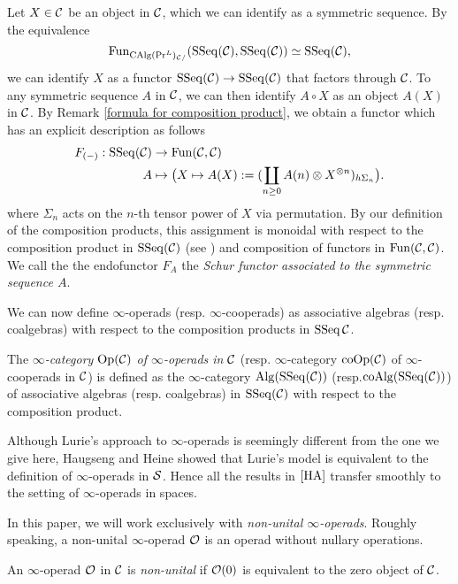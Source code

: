 \begin{remark}
\label{Schur functor}
Let $X \in {\mathcal{C}}$ be an object in ${\mathcal{C}}$, which we can identify as a symmetric sequence.
By the equivalence
$$
\operatorname{Fun}_{\operatorname{CAlg}(\Pr^L)_{{\mathcal{C}}/}}(\operatorname{SSeq}({\mathcal{C}}),\operatorname{SSeq}({\mathcal{C}}))
\simeq
\operatorname{SSeq}({\mathcal{C}}),
$$
we can identify $X$ as a functor $\operatorname{SSeq}({\mathcal{C}}) \to \operatorname{SSeq}({\mathcal{C}})$ that factors through ${\mathcal{C}}$.
To any symmetric sequence $A$ in ${\mathcal{C}}$,  we can then identify $A\circ X$ as an object $A(X)$ in ${\mathcal{C}}$.
By Remark \ref{formula for composition product}, we obtain a functor which has an explicit description as follows
\begin{align*}
		F_{(-)}: \operatorname{SSeq}({\mathcal{C}}) & \rightarrow \operatorname{Fun}({\mathcal{C}},{\mathcal{C}})\\
	A        & \mapsto \big( X\mapsto  A(X):=(\coprod_{n\geq 0} A(n)\otimes X^{\otimes n})_{h\Sigma_n}\big).
\end{align*}
where $\Sigma_n$ acts on the $n$-th tensor power of $X$ via permutation.
By our definition of the composition products, this assignment is monoidal with respect to the composition product in $\operatorname{SSeq}({\mathcal{C}})$ (see \cite[\S 3.1 ]{Francis-Gaitsgory}) and composition of functors in $\operatorname{Fun}({\mathcal{C}},{\mathcal{C}})$.
We call the the endofunctor $F_A$ the \emph{Schur functor associated to the symmetric sequence $A$}.
\end{remark}

We can now define $\infty$-operads (resp. $\infty$-cooperads) as associative algebras (resp. coalgebras) with respect to the composition products in $\operatorname{SSeq}{{\mathcal{C}}}$.
\begin{definition}
	\label{inf operads}
	The \emph{$\infty$-category $\operatorname{Op}({\mathcal{C}})$ of $\infty$-operads in ${\mathcal{C}}$} (resp. $\infty$-category $\operatorname{coOp}({\mathcal{C}})$ of $\infty$-cooperads in ${\mathcal{C}}$) is defined as the $\infty$-category $\operatorname{Alg}(\operatorname{SSeq}({\mathcal{C}}))$ (resp.$\operatorname{coAlg}(\operatorname{SSeq}({\mathcal{C}}))$) of associative algebras (resp. coalgebras) in $\operatorname{SSeq}({\mathcal{C}})$ with respect to the composition product.
\end{definition}


\begin{remark}
Although Lurie's approach to $\infty$-operads \cite[Chapter 2]{HA} is seemingly different from the one we give here,
Haugseng \cite{Haugsengsymseq} and Heine \cite{Hadrianphdthesis} showed that Lurie's model is equivalent to the definition of $\infty$-operads in $\operatorname{\mathcal{S}}$. Hence all the results in $\cite{HA}$ transfer smoothly to the setting of $\infty$-operads in spaces.
\end{remark}

In this paper, we will work exclusively with \emph{non-unital $\infty$-operads}. Roughly speaking, a non-unital $\infty$-operad ${\mathcal{O}}$ is an operad without nullary operations.
\begin{definition}
	\label{non-unital operad}
	An $\infty$-operad ${\mathcal{O}}$ in ${\mathcal{C}}$ is \emph{non-unital} if ${\mathcal{O}}(0)$ is equivalent to the zero object of ${\mathcal{C}}$. 
\end{definition}

